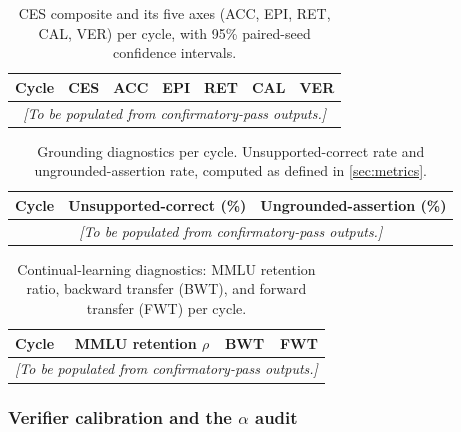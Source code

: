 \begin{table}[t]
\centering
\caption{CES composite and its five axes (ACC, EPI, RET, CAL, VER)
per cycle, with 95\% paired-seed confidence intervals.}
\label{tab:ces}
\begin{tabular}{lrrrrrr}
\toprule
Cycle & CES & ACC & EPI & RET & CAL & VER \\
\midrule
\multicolumn{7}{c}{\emph{[To be populated from confirmatory-pass outputs.]}}\\
\bottomrule
\end{tabular}
\end{table}

\begin{table}[t]
\centering
\caption{Grounding diagnostics per cycle. Unsupported-correct rate and
ungrounded-assertion rate, computed as defined in \cref{sec:metrics}.}
\label{tab:grounding}
\begin{tabular}{lrr}
\toprule
Cycle & Unsupported-correct (\%) & Ungrounded-assertion (\%) \\
\midrule
\multicolumn{3}{c}{\emph{[To be populated from confirmatory-pass outputs.]}}\\
\bottomrule
\end{tabular}
\end{table}

\begin{table}[t]
\centering
\caption{Continual-learning diagnostics: MMLU retention ratio,
backward transfer (BWT), and forward transfer (FWT) per cycle.}
\label{tab:continual}
\begin{tabular}{lrrr}
\toprule
Cycle & MMLU retention $\rho$ & BWT & FWT \\
\midrule
\multicolumn{4}{c}{\emph{[To be populated from confirmatory-pass outputs.]}}\\
\bottomrule
\end{tabular}
\end{table}

\subsubsection{Verifier calibration and the $\alpha$ audit}
\label{sec:verification-balanced-accuracy}

